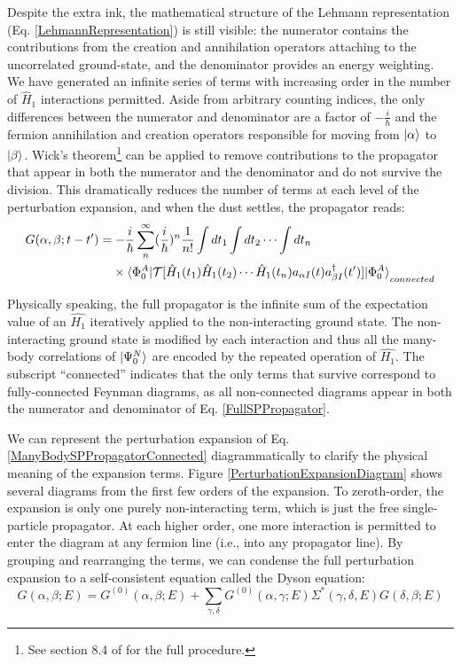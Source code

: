 \noindent
Despite the extra ink, the mathematical structure of the Lehmann
representation (Eq. \ref{LehmannRepresentation}) is still visible: the numerator contains
the contributions from the creation and annihilation operators attaching to the uncorrelated
ground-state, and the denominator provides an energy weighting. We have generated an infinite
series of terms with increasing order in the number of $\hat{H}_{1}$ interactions permitted.
Aside from arbitrary counting indices,
the only differences between the numerator and denominator are a
factor of $-\frac{i}{\hbar}$ and the fermion annihilation and creation operators
responsible for moving from $\ket{\alpha}$ to $\ket{\beta}$. Wick's
theorem\footnote{See section 8.4 of \cite{MBTE}
for the full procedure.} can be applied to remove contributions to the propagator
that appear in both the numerator and the denominator and do not survive the
division. This dramatically
reduces the number of terms at each level of the perturbation expansion, and when the dust settles,
the propagator reads:
\begin{equation} \label{ManyBodySPPropagatorConnected}
    \begin{split}
    G(\alpha, \beta; t-t') & =
    -\frac{i}{\hbar}\sum^{\infty}_{n}(\frac{i}{\hbar})^{n}
    \frac{1}{n!}\int dt_{1} \int dt_{2} \cdots \int dt_{n}\\
    & \phantom{ {}= } \times \braket{\Phi^{A}_{0}|
    \mathcal{T}[\hat{H}_{1}(t_{1})
    \hat{H}_{1}(t_{2}) \cdots \hat{H}_{1}(t_{n})a_{{\alpha}I}(t)a^{\dagger}_{{\beta}I}(t')]|\Phi^{A}_{0}}_{connected}
\end{split}
\end{equation}

Physically speaking, the full propagator is the infinite sum of the expectation value of 
an $\hat{H_{1}}$ iteratively applied to the non-interacting ground state. The
non-interacting ground state is modified by each interaction and thus all the many-body correlations
of $\ket{\Psi^{N}_{0}}$ are encoded by the repeated operation of $\hat{H_{1}}$. The subscript
``connected'' indicates that the only terms that survive correspond to fully-connected Feynman 
diagrams, as all non-connected diagrams appear in both the numerator and denominator of Eq. 
\ref{FullSPPropagator}.

We can represent the perturbation expansion of Eq. \ref{ManyBodySPPropagatorConnected}
diagrammatically to clarify the physical meaning of the expansion terms. Figure
\ref{PerturbationExpansionDiagram} shows several diagrams from the first few orders of the
expansion. To zeroth-order, 
the expansion is only one purely non-interacting term, which is just the free single-particle 
propagator. At each higher order, one more interaction is permitted to enter the diagram at any
fermion line (i.e., into any propagator line). By grouping and rearranging the terms, we can 
condense the full perturbation expansion to a
self-consistent equation called the Dyson equation:
\begin{equation} \label{DysonEquation}
    G(\alpha,\beta;E) = G^{(0)}(\alpha,\beta;E) +
    \sum_{\gamma,\delta}G^{(0)}(\alpha,\gamma;E)\Sigma^{*}(\gamma,\delta,E)G(\delta, \beta; E)
\end{equation}

